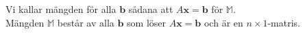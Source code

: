 Vi kallar mängden för alla $\bm{b}$ sådana att $A\bm{x}=\bm{b}$ för $\mathbb{M}$.\\
Mängden $\mathbb{M}$ består av alla $\bm{b}$ som löser $A\bm{x}=\bm{b}$ och är en $n\times 1$-matris.